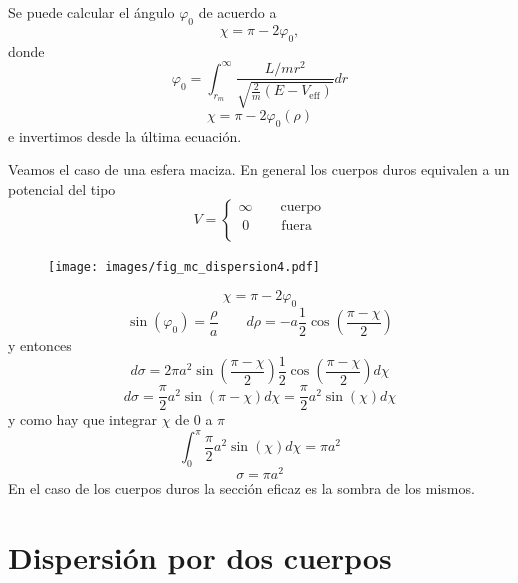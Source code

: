 \documentclass[10pt,oneside]{CBFT_book}
\begin{document}
Se puede calcular el ángulo $\varphi_0$ de acuerdo a 
\[
	\chi = \pi - 2\varphi_0,
\]
donde
\[
	\varphi_0 = \int_{r_m}^{\infty} \frac{L/mr^2}{\sqrt{\frac{2}{m}(E - V_{\text{eff}})}} dr
\]
\[
	\chi = \pi - 2 \varphi_0 (\rho)
\]
e invertimos desde la última ecuación.

Veamos el caso de una esfera maciza. En general los cuerpos duros equivalen a un potencial del tipo
\[
	V = \begin{cases}
	     \infty \qquad \textrm{cuerpo}\\
	     \;0 \qquad \; \textrm{fuera} \\
	    \end{cases}
\]
\begin{figure}[htb]
	\begin{center}
	\texttt{[image: images/fig\_mc\_dispersion4.pdf]}	 
	\end{center}
	\caption{}
\end{figure}
\[
	\chi = \pi - 2\varphi_0
\]
\[
	\sin(\varphi_0) = \frac{\rho}{a} \qquad d\rho = -a \frac{1}{2}\cos \left(\frac{\pi-\chi}{2}\right)
\]
y entonces 
\[
	d\sigma = 2\pi a^2 \sin\left(\frac{\pi-\chi}{2}\right) \frac{1}{2}\cos\left(\frac{\pi-\chi}{2}\right) d\chi
\]
\[
	d\sigma = \frac{\pi}{2} a^2 \sin( \pi-\chi) d\chi = \frac{\pi}{2} a^2 \sin( \chi) d\chi
\]
y como hay que integrar $\chi$ de 0 a $\pi$
\[
	\int_0^\pi \frac{\pi}{2} a^2 \sin( \chi) d\chi = \pi a^2
\]
\[
	\sigma = \pi a^2
\]
En el caso de los cuerpos duros la sección eficaz es la sombra de los mismos.


\section{Dispersión por dos cuerpos}
\end{document}
